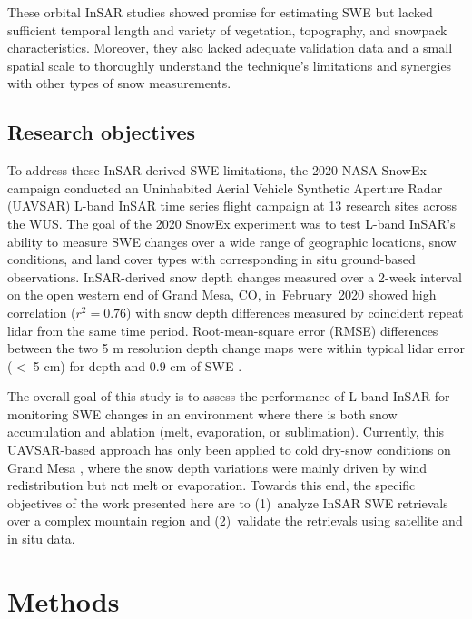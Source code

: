 These orbital InSAR studies showed promise for estimating SWE but lacked sufficient temporal length and variety of vegetation, topography, and snowpack characteristics. Moreover, they also lacked adequate validation data and a small spatial scale to thoroughly understand the technique's limitations and synergies with other types of snow measurements.


\hypertarget{ch3-intro-3}{\subsection{Research objectives}\label{ch3-intro-3}}


To address these InSAR-derived SWE limitations, the 2020 NASA SnowEx campaign \citep{marshallNASASnowEx20202019} conducted an Uninhabited Aerial Vehicle Synthetic Aperture Radar (UAVSAR) L-band InSAR time series flight campaign at 13 research sites across the WUS. The goal of the 2020 SnowEx experiment was to test L-band InSAR's ability to measure SWE changes over a wide range of geographic locations, snow conditions, and land cover types with corresponding in situ ground-based observations. InSAR-derived snow depth changes measured over a 2-week interval on the open western end of Grand Mesa, CO, in~February~2020 showed high correlation ($r^{2} = 0.76$) with snow depth differences measured by coincident repeat lidar from the same time period. Root-mean-square error (RMSE) differences between the two 5 m resolution depth change maps were within typical lidar error ($<$ 5 cm) for depth and 0.9 cm of SWE \citep{marshallLBandInSARDepth2021}.

The overall goal of this study is to assess the performance of L-band InSAR for monitoring SWE changes in an environment where there is both snow accumulation and ablation (melt, evaporation, or sublimation). Currently, this UAVSAR-based approach has only been applied to cold dry-snow conditions on Grand Mesa \citep{marshallLBandInSARDepth2021}, where the snow depth variations were mainly driven by wind redistribution but not melt or evaporation. Towards this end, the specific objectives of the work presented here are to (1)~analyze InSAR SWE retrievals over a complex mountain region and (2)~validate the retrievals using satellite and in situ data.

\hypertarget{ch3-methods}{\section{Methods}\label{ch3-methods}}


